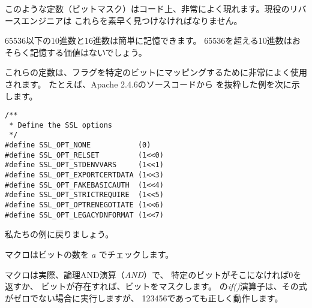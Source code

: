 このような定数（ビットマスク）はコード上、非常によく現れます。現役のリバースエンジニアは
これらを素早く見つけなければなりません。

65536以下の10進数と16進数は簡単に記憶できます。
65536を超える10進数はおそらく記憶する価値はないでしょう。

これらの定数は、フラグを特定のビットにマッピングするために非常によく使用されます。
たとえば、Apache 2.4.6のソースコードから
を抜粋した例を次に示します。

\begin{lstlisting}[style=customc]
/**
 * Define the SSL options
 */
#define SSL_OPT_NONE           (0)
#define SSL_OPT_RELSET         (1<<0)
#define SSL_OPT_STDENVVARS     (1<<1)
#define SSL_OPT_EXPORTCERTDATA (1<<3)
#define SSL_OPT_FAKEBASICAUTH  (1<<4)
#define SSL_OPT_STRICTREQUIRE  (1<<5)
#define SSL_OPT_OPTRENEGOTIATE (1<<6)
#define SSL_OPT_LEGACYDNFORMAT (1<<7)
\end{lstlisting}

私たちの例に戻りましょう。

マクロはビットの数を $a$ でチェックします。

マクロは実際、論理AND演算（\emph{AND}）で、
特定のビットがそこになければ0を返すか、
ビットが存在すれば、ビットをマスクします。
\CCpp の\emph{if()}演算子は、その式がゼロでない場合に実行しますが、
123456であっても正しく動作します。





